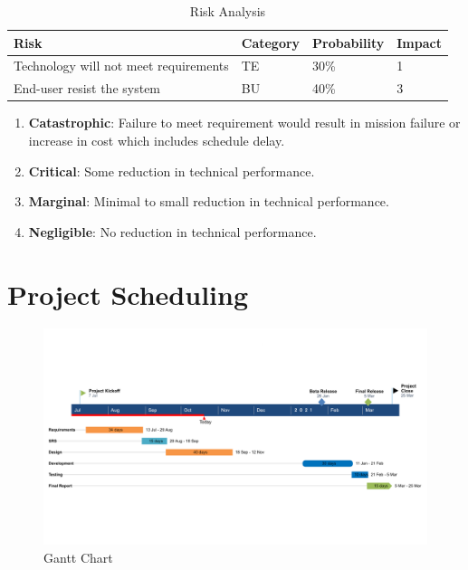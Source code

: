 \newpage
\begin{table}[!ht]
\centering
\begin{tabular}{|l|l|l|l|}
\hline
Risk                                  & Category & Probability & Impact \\ \hline
Technology will not meet requirements & TE       & 30\%        & 1      \\ \hline
End-user resist the system            & BU       & 40\%        & 3      \\ \hline
\end{tabular}
\caption{Risk Analysis}
\end{table}

\begin{enumerate}
    \item \textbf{Catastrophic}: Failure to meet requirement would result in mission failure or increase in cost which includes schedule delay.
    \item \textbf{Critical}: Some reduction in technical performance.
    \item \textbf{Marginal}: Minimal to small reduction in technical performance.
    \item \textbf{Negligible}: No reduction in technical performance.

\end{enumerate}


\section{Project Scheduling}
\begin{figure}[h]
    \centering
    \includegraphics[width=\textwidth]{Project Planning and Management/Gantt_char_new.png}
    \caption{Gantt Chart}
\end{figure}
\newpage

